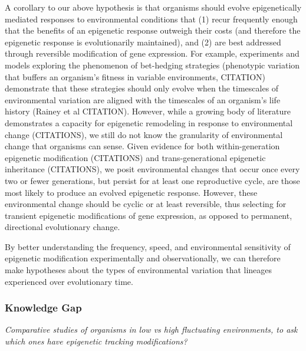 \documentclass{article}
\begin{document}
A corollary to our above hypothesis is that organisms should evolve epigenetically mediated responses to environmental conditions that (1) recur frequently enough that the benefits of an epigenetic response outweigh their costs (and therefore the epigenetic response is evolutionarily maintained), and (2) are best addressed through reversible modification of gene expression. For example, experiments and models exploring the phenomenon of bet-hedging strategies (phenotypic variation that buffers an organism's fitness in variable environments, CITATION) demonstrate that these strategies should only evolve when the timescales of environmental variation are aligned with the timescales of an organism's life history (Rainey et al CITATION). However, while a growing body of literature demonstrates a capacity for epigenetic remodeling in response to environmental change (CITATIONS), we still do not know the granularity of environmental change that organisms can sense. Given evidence for both within-generation epigenetic modification (CITATIONS) and trans-generational epigenetic inheritance (CITATIONS), we posit environmental changes that occur once every two or fewer generations, but persist for at least one reproductive cycle, are those most likely to produce an evolved epigenetic response. However, these environmental change should be cyclic or at least reversible, thus selecting for transient epigenetic modifications of gene expression, as opposed to permanent, directional evolutionary change. 

By better understanding the frequency, speed, and environmental sensitivity of epigenetic modification experimentally and observationally, we can therefore make hypotheses about the types of environmental variation that lineages experienced over evolutionary time. 



\subsubsection{Knowledge Gap}

\textit{Comparative studies of organisms in low vs high fluctuating environments, to ask which ones have epigenetic tracking modifications?}
\end{document}
